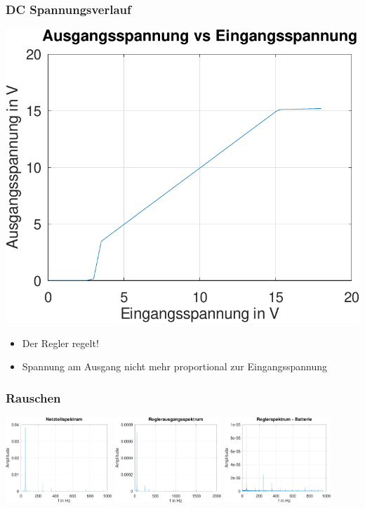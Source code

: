 \documentclass[aspectratio=32]{beamer}
\begin{document}
\begin{frame}
  \frametitle{DC Spannungsverlauf}
  \centering
  \includegraphics[height=0.5\textheight]{../common/messungen/in_vs_out.pdf}
  \begin{itemize}
    \item Der Regler regelt!
    \item Spannung am Ausgang nicht mehr proportional zur Eingangsspannung
  \end{itemize}
\end{frame}

\begin{frame}
  \frametitle{Rauschen}
  \centering
  \includegraphics[width=0.3\textwidth]{../common/messungen/netzteilspektrum.pdf}
  \includegraphics[width=0.3\textwidth]{../common/messungen/reglerspektrum.pdf}
  \includegraphics[width=0.3\textwidth]{../common/messungen/regler-spkt-batt.pdf}
\end{frame}
\end{document}
